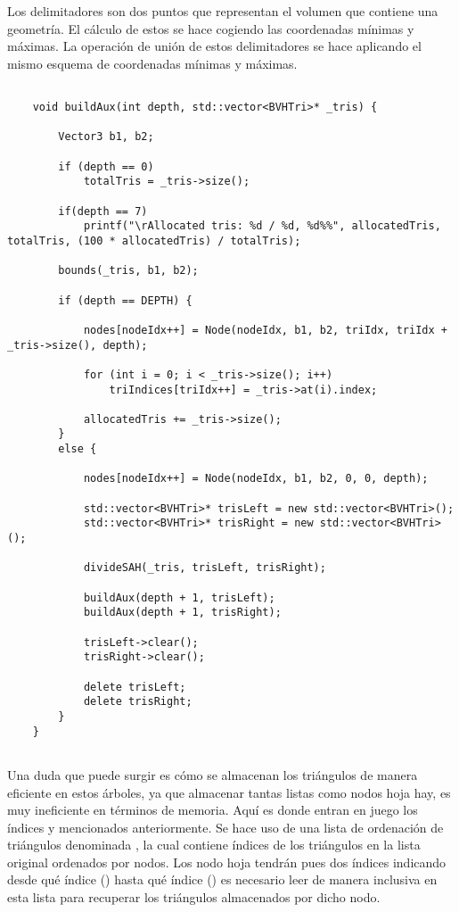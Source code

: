Los delimitadores son dos puntos que representan el volumen que contiene una geometría. El cálculo de estos se hace cogiendo las coordenadas mínimas y máximas. La operación de unión de estos delimitadores se hace aplicando el mismo esquema de coordenadas mínimas y máximas.

\begin{lstlisting}
	
	void buildAux(int depth, std::vector<BVHTri>* _tris) {

		Vector3 b1, b2;

		if (depth == 0)
			totalTris = _tris->size();

		if(depth == 7)
			printf("\rAllocated tris: %d / %d, %d%%", allocatedTris, totalTris, (100 * allocatedTris) / totalTris);

		bounds(_tris, b1, b2);

		if (depth == DEPTH) {

			nodes[nodeIdx++] = Node(nodeIdx, b1, b2, triIdx, triIdx + _tris->size(), depth);

			for (int i = 0; i < _tris->size(); i++)
				triIndices[triIdx++] = _tris->at(i).index;

			allocatedTris += _tris->size();
		}
		else {

			nodes[nodeIdx++] = Node(nodeIdx, b1, b2, 0, 0, depth);

			std::vector<BVHTri>* trisLeft = new std::vector<BVHTri>();
			std::vector<BVHTri>* trisRight = new std::vector<BVHTri>();

			divideSAH(_tris, trisLeft, trisRight);

			buildAux(depth + 1, trisLeft);
			buildAux(depth + 1, trisRight);

			trisLeft->clear();
			trisRight->clear();

			delete trisLeft;
			delete trisRight;
		}
	}
	
\end{lstlisting}

Una duda que puede surgir es cómo se almacenan los triángulos de manera eficiente en estos árboles, ya que almacenar tantas listas como nodos hoja hay, es muy ineficiente en términos de memoria. Aquí es donde entran en juego los índices  y  mencionados anteriormente. Se hace uso de una lista de ordenación de triángulos denominada , la cual contiene índices de los triángulos en la lista original ordenados por nodos. Los nodo hoja tendrán pues dos índices indicando desde qué índice () hasta qué índice () es necesario leer de manera inclusiva en esta lista para recuperar los triángulos almacenados por dicho nodo.

